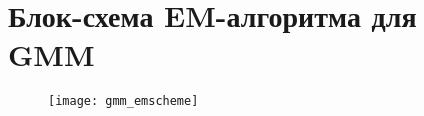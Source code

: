 \chapter{Блок-схема EM-алгоритма для GMM}
\label{app:GMM:EMScheme}
\begin{figure}[H]
\texttt{[image: gmm\_emscheme]}
\end{figure}